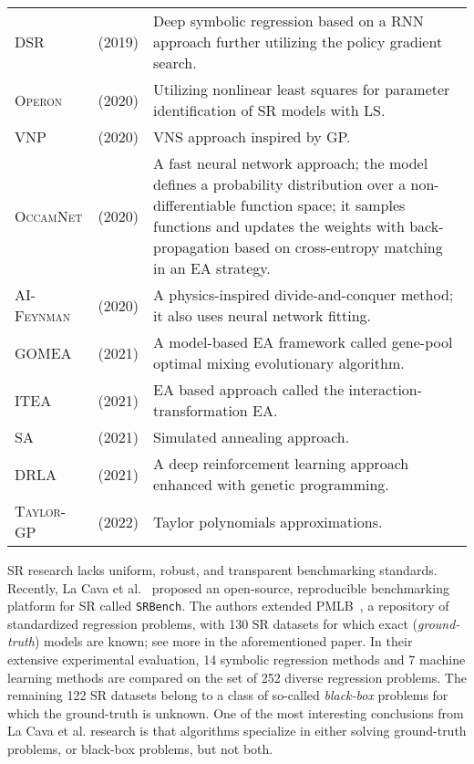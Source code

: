 \documentclass{bmcart}
\begin{document}
\begin{table}[!h]
{\begin{tabularx}{550pt}{l  l  X}
			\textsc{DSR}  & \cite{petersen2019deep} (2019) & Deep symbolic regression based on a RNN approach further utilizing the policy gradient search. \\
			\textsc{Operon} & \cite{kommenda2020parameter} (2020) &  Utilizing nonlinear least squares for parameter identification of SR models with LS. \\
			\textsc{VNP}    & \cite{elleuch2020variable} (2020) & VNS approach inspired by GP. \\
			\textsc{OccamNet} & \cite{costa2020fast} (2020) &   A fast neural network approach; the model defines a probability distribution over a non-differentiable function space; it samples functions and updates the weights with back-propagation based on cross-entropy matching in an EA strategy.	 \\
			
			\textsc{AI-Feynman} & \cite{udrescu2020ai} (2020) & A physics-inspired divide-and-conquer method; it also uses neural network fitting. \\
			\textsc{GOMEA}  & \cite{virgolin2021improving} (2021)    & A model-based
			EA framework called gene-pool optimal mixing evolutionary algorithm. \\
			\textsc{ITEA} & \cite{de2021interaction} (2021)   & EA based approach called the interaction-transformation EA.   \\
			\textsc{SA} & \cite{kantor2021simulated} (2021) &  Simulated annealing approach. \\
			
			\textsc{DRLA} & \cite{mundhenk2021symbolic} (2021)  &    A deep reinforcement learning approach enhanced with genetic programming. \\
			\textsc{Taylor-GP} &  \cite{he2022taylor} (2022)  &  Taylor polynomials approximations.  \\ \hline
			
	\end{tabularx} }
\end{table}

	
SR research lacks uniform, robust, and transparent
benchmarking standards. Recently, La Cava et al.~\cite{la2021contemporary} proposed an
open-source, reproducible benchmarking platform for SR called \texttt{SRBench}. The authors extended  PMLB~\cite{olson2017pmlb},  a repository of standardized regression problems, with 130 SR datasets for which exact (\emph{ground-truth}) models are known; see more in the aforementioned paper. In their extensive experimental evaluation, 14
symbolic regression methods and 7 machine learning methods are compared on the set of 252 diverse regression problems. The remaining 122 SR datasets belong to a class of so-called \emph{black-box} problems for which the ground-truth is unknown. One of the most interesting conclusions from La Cava et al. research is that algorithms specialize in either solving ground-truth problems, or black-box problems, but not both. 
\end{document}
